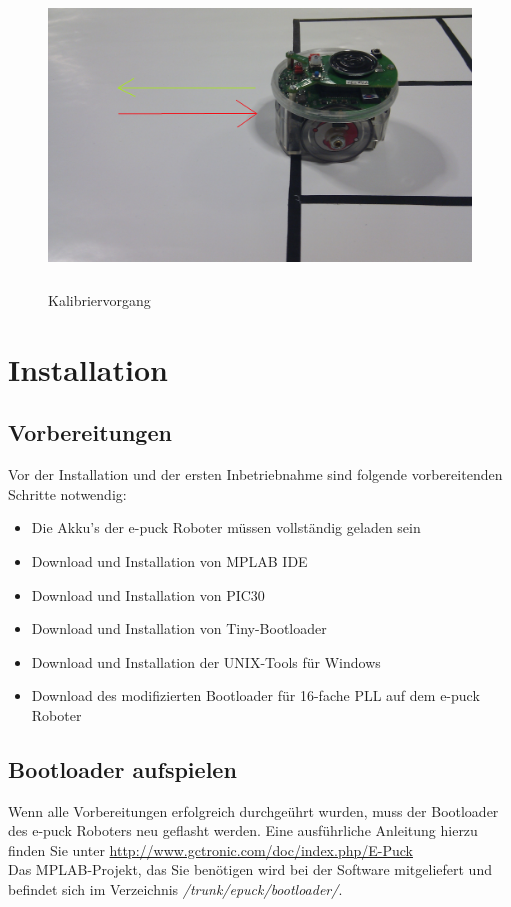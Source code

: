 \documentclass[10pt,a4paper]{article}
\let\oldsection\section
\renewcommand{\section}{\newpage \oldsection}
\begin{document}
		\vspace{30pt}
		 \begin{figure}[htbp]
			\includegraphics[height=8cm]{images/puck3.png} 
			\caption{Kalibriervorgang}
			\label{kalibrierabbildung}
		\end{figure}
\section{Installation}
			\subsection{Vorbereitungen} 
			Vor der Installation und der ersten Inbetriebnahme sind folgende vorbereitenden Schritte notwendig:
			\begin{itemize}
				\item{Die Akku's der e-puck Roboter m\"ussen vollst\"andig geladen sein}
				\item{Download und Installation von MPLAB IDE}
				\item{Download und Installation von PIC30}
				\item{Download und Installation von Tiny-Bootloader}
				\item{Download und Installation der UNIX-Tools f\"ur Windows}
				\item{Download des modifizierten Bootloader f\"ur 16-fache PLL auf dem e-puck Roboter}
			\end{itemize}
			\subsection{Bootloader aufspielen} 
				Wenn alle Vorbereitungen erfolgreich durchge\"uhrt wurden, muss der Bootloader des e-puck Roboters neu geflasht werden. Eine ausf\"uhrliche
				Anleitung hierzu finden Sie unter \url{http://www.gctronic.com/doc/index.php/E-Puck} \\
				Das MPLAB-Projekt, das Sie ben\"otigen wird bei der Software mitgeliefert und befindet sich im Verzeichnis \textit{/trunk/epuck/bootloader/}.
\end{document}
